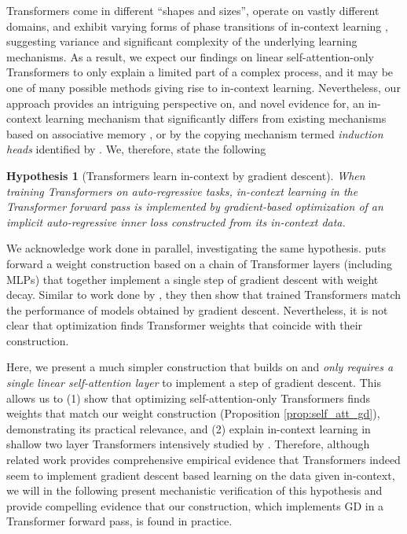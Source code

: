 \documentclass{article}
\newtheorem{hyp}{Hypothesis}
\theoremstyle{plain}
\theoremstyle{definition}
\theoremstyle{remark}
\begin{document}
Transformers come in different ``shapes and sizes'', operate on vastly different domains, and exhibit varying forms of phase transitions of in-context learning \citep{kirsch2022generalpurpose, Trans_generalize_differently_weights}, suggesting variance and significant complexity of the underlying learning mechanisms. As a result, we expect our findings on linear self-attention-only Transformers to only explain a limited part of a complex process, and it may be one of many possible methods giving rise to in-context learning. Nevertheless, our approach provides an intriguing perspective on, and novel evidence for, an in-context learning mechanism that significantly differs from existing mechanisms based on associative memory \citep{hopfield}, or by the copying mechanism termed \textit{induction heads} identified by \cite{induction_heads}. We, therefore, state the following 

\begin{hyp}[Transformers learn in-context by gradient descent]
\label{prop:hyp}
When training Transformers on auto-regressive tasks, in-context learning in the Transformer forward pass is implemented by gradient-based optimization of an implicit auto-regressive inner loss constructed from its in-context data.
\vspace{-5pt}
\end{hyp}

We acknowledge work done in parallel, investigating the same hypothesis. \citet{related_work} puts forward a weight construction based on a chain of Transformer layers (including MLPs) that together implement a single step of gradient descent with weight decay. Similar to work done by \citet{simple_case_study}, they then show that trained Transformers match the performance of models obtained by gradient descent. Nevertheless, it is not clear that optimization finds Transformer weights that coincide with their construction. 

Here, we present a much simpler construction that builds on \citet{linear_transformers_fast_weight} and \emph{only requires a single linear self-attention layer} to implement a step of gradient descent. 
This allows us to (1) show that optimizing self-attention-only Transformers finds weights that match our weight construction (Proposition \ref{prop:self_att_gd}), demonstrating its practical relevance, and (2) explain in-context learning in shallow two layer Transformers intensively studied by \citet{induction_heads}. Therefore, although related work provides comprehensive empirical evidence that Transformers indeed seem to implement gradient descent based learning on the data given in-context, we will in the following present mechanistic verification of this hypothesis and provide compelling evidence that our construction, which implements GD in a Transformer forward pass, is found in practice.
\end{document}
